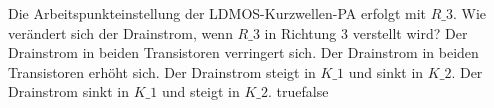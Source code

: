     {Die Arbeitspunkteinstellung der LDMOS-Kurzwellen-PA erfolgt mit $R\_3$. Wie verändert sich der Drainstrom, wenn $R\_3$ in Richtung 3 verstellt wird?}
    {Der Drainstrom in beiden Transistoren verringert sich.}
    {Der Drainstrom in beiden Transistoren erhöht sich.}
    {Der Drainstrom steigt in $K\_1$ und sinkt in $K\_2$.}
    {Der Drainstrom sinkt in $K\_1$ und steigt in $K\_2$.}
    {true}{false}
